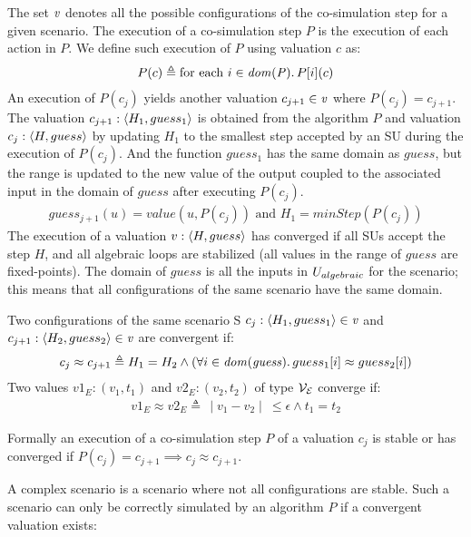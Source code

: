 The set $\mathit{v}$ denotes all the possible configurations of the co-simulation step for a given scenario. The execution of a co-simulation step $P$ is the execution of each action in $P$. We define such execution of $P$ using valuation $c$ as:
\begin{align}
  P(c) \triangleq \text{for each } i \in \mathit{dom(P)} \ldotp P[i](c)
\end{align}
An execution of $P(c_j)$ yields another valuation $c_{j+1} \in \mathit{v}$ where $P(c_j) = c_{j+1}$. The valuation $c_{j+1}:  \left\langle H_1, guess_1 \right\rangle $ is obtained from the algorithm $P$ and valuation $c_j:  \left\langle H, guess \right\rangle $ by updating $H_1$ to the smallest step accepted by an SU during the execution of $P(c_j)$. And the function $guess_1$ has the same domain as $guess$, but the range is updated to the new value of the output coupled to the associated input in the domain of $guess$ after executing $P(c_j)$.
\vspace{-1em}
\begin{align}
  guess_{j+1}(u) = value(u,P(c_j)) \text{ and } H_1 = minStep(P(c_j))  
\end{align}  
The execution of a valuation $v:  \left\langle H, guess \right\rangle $ has converged if all SUs accept the step $H$, and all algebraic loops are stabilized (all values in the range of $guess$ are fixed-points). 
The domain of $guess$ is all the inputs in $U_{algebraic}$ for the scenario; this means that all configurations of the same scenario have the same domain.
\begin{definition}\label{def:convergent}
  Two configurations of the same scenario S $c_j: \left\langle H_1,guess_1 \right\rangle  \in \mathit{v}$ and $c_{j+1}:  \left\langle H_2, guess_2 \right\rangle  \in \mathit{v}$ are convergent if:
  \begin{align*}
    c_j \approx c_{j+1} \triangleq H_1 = H_2 \land (\forall i \in \mathit{dom(guess)} \ldotp guess_1[i] \approx guess_2[i])
  \end{align*}
  Two values $v1_E: (v_1, t_1)$ and $v2_E: (v_2, t_2)$ of type $\mathcal{V_{E}}$ converge if:
  \begin{align}
    v1_E \approx v2_E \triangleq \, \mid v_1 - v_2 \mid \ \leq \epsilon \land t_1 = t_2
  \end{align}
\end{definition}

Formally an execution of a co-simulation step $P$ of a valuation $c_j$ is stable or has converged if $P(c_j) = c_{j+1} \implies c_j \approx c_{j+1}$.

A complex scenario is a scenario where not all configurations are stable. Such a scenario can only be correctly simulated by an algorithm $P$ if a convergent valuation exists:

